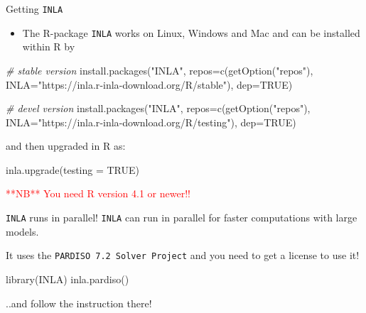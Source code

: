 \documentclass[
  ignorenonframetext,
]{beamer}
\newenvironment{Shaded}{\begin{snugshade}}{\end{snugshade}}
\newcommand{\AttributeTok}[1]{\textcolor[rgb]{0.77,0.63,0.00}{#1}}
\newcommand{\CommentTok}[1]{\textcolor[rgb]{0.56,0.35,0.01}{\textit{#1}}}
\newcommand{\ConstantTok}[1]{\textcolor[rgb]{0.00,0.00,0.00}{#1}}
\newcommand{\FunctionTok}[1]{\textcolor[rgb]{0.00,0.00,0.00}{#1}}
\newcommand{\NormalTok}[1]{#1}
\newcommand{\StringTok}[1]{\textcolor[rgb]{0.31,0.60,0.02}{#1}}
\providecommand{\tightlist}{%
  \setlength{\itemsep}{0pt}\setlength{\parskip}{0pt}}
\begin{document}
\begin{frame}[fragile]{Getting \texttt{INLA}}
\protect\hypertarget{getting-inla-2}{}
\begin{itemize}
\tightlist
\item
  The R-package \texttt{INLA} works on Linux, Windows and Mac and can be
  installed within R by
\end{itemize}

\footnotesize

\begin{Shaded}
\begin{Highlighting}[]
\CommentTok{\# stable version}
\FunctionTok{install.packages}\NormalTok{(}\StringTok{"INLA"}\NormalTok{,}
          \AttributeTok{repos=}\FunctionTok{c}\NormalTok{(}\FunctionTok{getOption}\NormalTok{(}\StringTok{"repos"}\NormalTok{),}
          \AttributeTok{INLA=}\StringTok{"https://inla.r{-}inla{-}download.org/R/stable"}\NormalTok{),}
          \AttributeTok{dep=}\ConstantTok{TRUE}\NormalTok{)}

\CommentTok{\# devel version }
\FunctionTok{install.packages}\NormalTok{(}\StringTok{"INLA"}\NormalTok{,}
        \AttributeTok{repos=}\FunctionTok{c}\NormalTok{(}\FunctionTok{getOption}\NormalTok{(}\StringTok{"repos"}\NormalTok{),}
        \AttributeTok{INLA=}\StringTok{"https://inla.r{-}inla{-}download.org/R/testing"}\NormalTok{),}
        \AttributeTok{dep=}\ConstantTok{TRUE}\NormalTok{)}
\end{Highlighting}
\end{Shaded}

\normalsize

and then upgraded in R as:

\begin{Shaded}
\begin{Highlighting}[]
\FunctionTok{inla.upgrade}\NormalTok{(}\AttributeTok{testing =} \ConstantTok{TRUE}\NormalTok{)}
\end{Highlighting}
\end{Shaded}

\textcolor{red}{**NB** You need R version 4.1 or newer!!}
\end{frame}

\begin{frame}[fragile]{\texttt{INLA} runs in parallel!}
\protect\hypertarget{inla-runs-in-parallel}{}
\texttt{INLA} can run in parallel for faster computations with large
models.

It uses the \texttt{PARDISO\ 7.2\ Solver\ Project} and you need to get a
license to use it!

\begin{Shaded}
\begin{Highlighting}[]
\FunctionTok{library}\NormalTok{(INLA)}
\FunctionTok{inla.pardiso}\NormalTok{()}
\end{Highlighting}
\end{Shaded}

..and follow the instruction there!
\end{frame}
\end{document}
